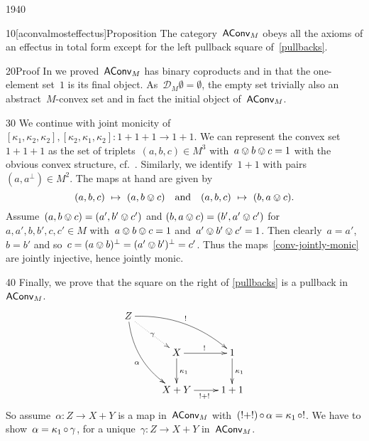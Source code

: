 \begin{parsec}{1940}%
\begin{point}{10}[aconvalmosteffectus]{Proposition}%
The category~$\mathsf{AConv}_M$ obeys all the axioms of an effectus in total
form except for the left pullback square of~\eqref{pullbacks}.
\begin{point}{20}{Proof}%
In  we proved~$\mathsf{AConv}_M$ has binary coproducts
    and in 
    that the one-element set~$1$ is its final object.
As~$\mathcal{D}_M \emptyset = \emptyset$,
    the empty set trivially also an abstract~$M$-convex set
    and in fact the initial object of~$\mathsf{AConv}_M$.
\end{point}
\begin{point}{30}%
We continue with joint monicity
    of~$[\kappa_1,\kappa_2,\kappa_2],
    [\kappa_2,\kappa_1,\kappa_2]\colon 1+1+1 \to 1+1$.
We can represent the convex set~$1+1+1$
    as the set of triplets~$(a,b,c) \in M^3$
    with~$a\ovee b \ovee c = 1$
    with the obvious convex structure,
    cf.~.
Similarly, we identify~$1+1$
    with pairs~$(a,a^\perp) \in M^2$.
    The maps at hand are given by
\begin{equation}\label{conv-jointly-monic}
    (a,b,c) \ \mapsto\  (a , b\ovee c)\quad \text{and} \quad
    (a,b,c) \ \mapsto\  (b, a\ovee c).
\end{equation}
Assume~$
(a, b \ovee c) = 
(a', b' \ovee c') $
and
$(b, a \ovee c) = 
(b', a' \ovee c') $
for~$a,a',b,b',c,c' \in M$ with~$a \ovee b \ovee c= 1$
and~$a' \ovee b' \ovee c'= 1$.
Then clearly~$a=a'$,~$b=b'$
    and so~$c = (a\ovee b)^\perp = (a' \ovee b')^\perp = c'$.
Thus the maps~\eqref{conv-jointly-monic} are jointly injective,
    hence jointly monic.
\end{point}
\begin{point}{40}%
Finally, we prove that the square on the right of \eqref{pullbacks}
    is a pullback in~$\mathsf{AConv}_M$.
\begin{equation*}
\xymatrix{
    Z \ar@/^1pc/[rrd]^{!}
        \ar@/_1pc/[rdd]_\alpha
        \ar@{.>}[rd]|\gamma\\
        &X \ar[r]^{!} \ar[d]^{\kappa_1}
        & 1\ar[d]^{\kappa_1} \\
        &X+Y\ar[r]_{!+!} & 1+1
    }
\end{equation*}
So assume~$\alpha \colon Z \to X+Y$
    is a map in~$\mathsf{AConv}_M$
    with~$(!+!) \mathop{\circ} \alpha = \kappa_1 \mathop{\circ} !$.
We have to show~$\alpha = \kappa_1 \mathop{\circ} \gamma$,
    for a unique~$\gamma\colon Z \to X+Y$ in~$\mathsf{AConv}_M$.

\end{point}
\end{point}
\end{parsec}
